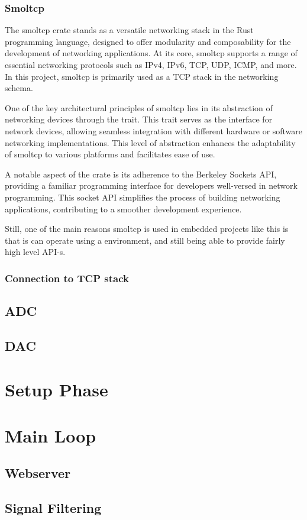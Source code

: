 \subsubsection{Smoltcp}

The smoltcp crate stands as a versatile networking stack in the Rust programming language, designed to offer modularity and composability for the development of networking applications. At its core, smoltcp supports a range of essential networking protocols such as IPv4, IPv6, TCP, UDP, ICMP, and more. In this project, smoltcp is primarily used as a TCP stack in the networking schema. \cite{Smoltcp}

One of the key architectural principles of smoltcp lies in its abstraction of networking devices through the  trait. This trait serves as the interface for network devices, allowing seamless integration with different hardware or software networking implementations. This level of abstraction enhances the adaptability of smoltcp to various platforms and facilitates ease of use.

A notable aspect of the crate is its adherence to the Berkeley Sockets API, providing a familiar programming interface for developers well-versed in network programming. This socket API simplifies the process of building networking applications, contributing to a smoother development experience.

Still, one of the main reasons smoltcp is used in embedded projects like this is that is can operate using a  environment, and still being able to provide fairly high level API-s.

\subsubsection{Connection to TCP stack}



\subsection{ADC}

\subsection{DAC}


\section{Setup Phase}


\section{Main Loop}

\subsection{Webserver}

\subsection{Signal Filtering}
